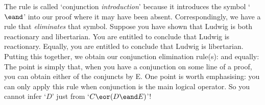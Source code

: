 The rule is called `conjunction \emph{introduction}' because it introduces the symbol `$\eand$' into our proof where it may have been absent. Correspondingly, we have a rule that \emph{eliminates} that symbol.  Suppose you have shown that Ludwig is both reactionary and libertarian. You are entitled to conclude that Ludwig is reactionary. Equally, you are entitled to conclude that Ludwig is libertarian. Putting this together, we obtain our conjunction elimination rule(s):
and equally:
The point is simply that, when you have a conjunction on some line of a proof, you can obtain either of the conjuncts by {\eand}E. One point is worth emphasising: you can only apply this rule when conjunction is the main logical operator. So you cannot infer `$D$' just from `$C \eor (D \eand E)$'!

